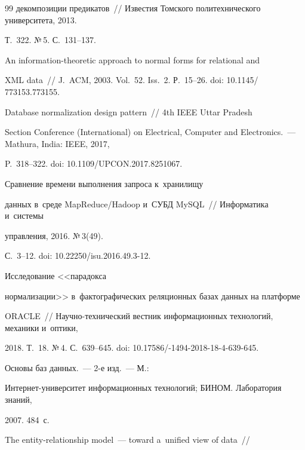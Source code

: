{{\begin{thebibliography}{99}
декомпозиции предикатов~/\!\!/ Известия Томского политехнического университета, 2013. 

Т.~322. №\,5. С.~131--137.




 An information-theoretic approach to normal forms for relational and 

XML data~/\!\!/ J.~ACM, 2003. Vol.~52. Iss.~2. Р.~15--26. doi: 10.1145\!/ 773153.773155.




 Database normalization design pattern~/\!\!/ 4th IEEE Uttar Pradesh 

Section  Conference (International) on Electrical, Computer and Electronics.~--- Mathura, India: IEEE, 2017,  

P.~318--322. doi: 10.1109\!/\!UPCON.2017.8251067.




 Сравнение времени выполнения запроса к~хранилищу 

данных в~среде MapReduce\!/\!Hadoop и~СУБД MySQL~/\!\!/ Информатика и~сис\-те\-мы 

управ\-ле\-ния, 2016. №\,3(49).  

С.~3--12. doi: 10.22250\!/\!isu.2016.49.3-12.


 Исследование <<парадокса 

нормализации>> в~фактографических реляционных базах данных на платформе 

ORACLE~/\!\!/ На\-уч\-но-тех\-ни\-че\-ский вестник информационных технологий, механики и~оптики, 

2018. Т.~18. №\,4. С.~639--645. doi: 10.17586\!/-1494-2018-18-4-639-645.


 Основы баз данных.~--- 2-е изд.~--- М.:  

Ин\-тер\-нет-уни\-вер\-си\-тет информационных технологий; БИНОМ. Лаборатория знаний, 

2007. 484~с.


 The entity-relationship model~--- toward a~unified view of data~/\!\!/ 


\end{thebibliography}}}
